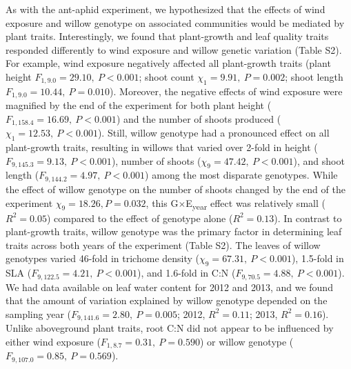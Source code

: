 \documentclass[11pt]{article}
\begin{document}
As with the ant-aphid experiment, we hypothesized that the effects of
wind exposure and willow genotype on associated communities would be
mediated by plant traits. Interestingly, we found that plant-growth and
leaf quality traits responded differently to wind exposure and willow
genetic variation (Table S2). For example, wind exposure negatively
affected all plant-growth traits (plant height \(F_{1,9.0}=29.10,\ P<0.001\); shoot
count \(\chi_1=9.91,\ P=0.002\); shoot length \(F_{1,9.0}=10.44,\ P=0.010\)). Moreover, the
negative effects of wind exposure were magnified by the end of the
experiment for both plant height (\(F_{1,158.4}=16.69,\ P<0.001\)) and the number of
shoots produced (\(\chi_1=12.53,\ P<0.001\)). Still, willow genotype had a
pronounced effect on all plant-growth traits, resulting in willows that
varied over 2-fold in height (\(F_{9,145.3}=9.13,\ P<0.001\)), number of shoots
(\(\chi_9=47.42,\ P<0.001\)), and shoot length (\(F_{9,144.2}=4.97,\ P<0.001\)) among the most
disparate genotypes. While the effect of willow genotype on the number
of shoots changed by the end of the experiment \(\chi_9=18.26, P = 0.032\),
this G$\times$E\textsubscript{year} effect was relatively small (\(R^2=0.05\))
compared to the effect of genotype alone (\(R^2=0.13\)). In
contrast to plant-growth traits, willow genotype was the primary factor
in determining leaf traits across both years of the experiment (Table
S2). The leaves of willow genotypes varied 46-fold in trichome density
(\(\chi_9=67.31,\ P<0.001\)), 1.5-fold in SLA (\(F_{9,122.5}=4.21,\ P<0.001\)), and 1.6-fold
in C:N (\(F_{9,70.5}=4.88,\ P<0.001\)). We had data available on leaf water content
for 2012 and 2013, and we found that the amount of variation explained
by willow genotype depended on the sampling year (\(F_{9,141.6}=2.80,\ P=0.005\);
2012, \(R^2=0.11\); 2013, \(R^2=0.16\)). Unlike aboveground
plant traits, root C:N did not appear to be influenced by either wind
exposure (\(F_{1,8.7}=0.31,\ P=0.590\)) or willow genotype (\(F_{9,107.0}=0.85,\ P=0.569\)).
\end{document}
